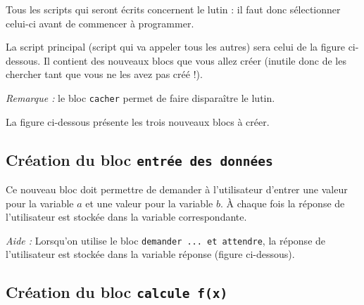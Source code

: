 
Tous les scripts qui seront écrits concernent le lutin : il faut donc sélectionner celui-ci avant de commencer à programmer.

\vspace{6pt}

La script principal (script qui va appeler tous les autres) sera celui de la figure ci-dessous. Il contient des nouveaux blocs que vous allez créer (inutile donc de les chercher tant que vous ne les avez pas créé !).


\emph{Remarque :} le bloc \texttt{cacher} permet de faire disparaître le lutin.

\vspace{6pt}

La figure ci-dessous présente les trois nouveaux blocs à créer.




\subsection{Création du bloc \texttt{entrée des données}}


Ce nouveau bloc doit permettre de demander à l'utilisateur d'entrer une valeur pour la variable $a$ et une valeur pour la variable $b$. À chaque fois la réponse de l'utilisateur est stockée dans la variable correspondante.

\vspace{6pt}

\emph{Aide :} Lorsqu'on utilise le bloc \texttt{demander ... et attendre}, la réponse de l'utilisateur est stockée dans la variable réponse (figure ci-dessous).





\subsection{Création du bloc \texttt{calcule f(x)}}


